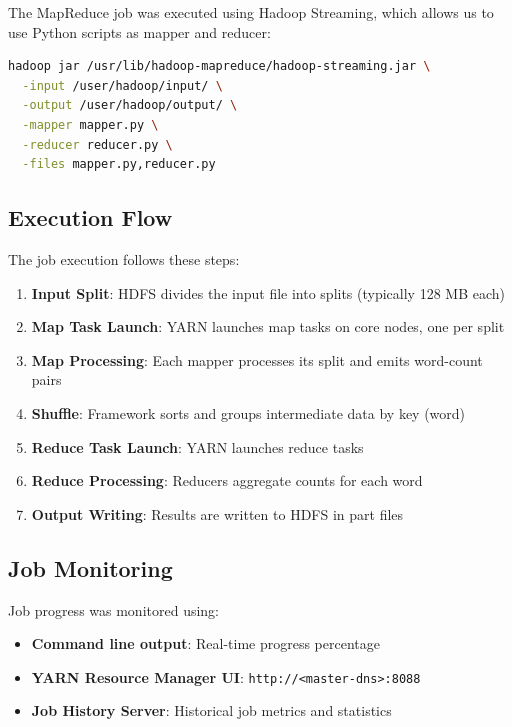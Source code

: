\documentclass[11pt,a4paper]{article}
\begin{document}
The MapReduce job was executed using Hadoop Streaming, which allows us to use Python scripts as mapper and reducer:

\begin{lstlisting}[language=bash, caption=MapReduce Job Execution Command]
hadoop jar /usr/lib/hadoop-mapreduce/hadoop-streaming.jar \
  -input /user/hadoop/input/ \
  -output /user/hadoop/output/ \
  -mapper mapper.py \
  -reducer reducer.py \
  -files mapper.py,reducer.py
\end{lstlisting}

\subsection{Execution Flow}

The job execution follows these steps:

\begin{enumerate}
    \item \textbf{Input Split}: HDFS divides the input file into splits (typically 128 MB each)
    \item \textbf{Map Task Launch}: YARN launches map tasks on core nodes, one per split
    \item \textbf{Map Processing}: Each mapper processes its split and emits word-count pairs
    \item \textbf{Shuffle}: Framework sorts and groups intermediate data by key (word)
    \item \textbf{Reduce Task Launch}: YARN launches reduce tasks
    \item \textbf{Reduce Processing}: Reducers aggregate counts for each word
    \item \textbf{Output Writing}: Results are written to HDFS in part files
\end{enumerate}

\subsection{Job Monitoring}

Job progress was monitored using:

\begin{itemize}
    \item \textbf{Command line output}: Real-time progress percentage
    \item \textbf{YARN Resource Manager UI}: \texttt{http://<master-dns>:8088}
    \item \textbf{Job History Server}: Historical job metrics and statistics
\end{itemize}
\end{document}
